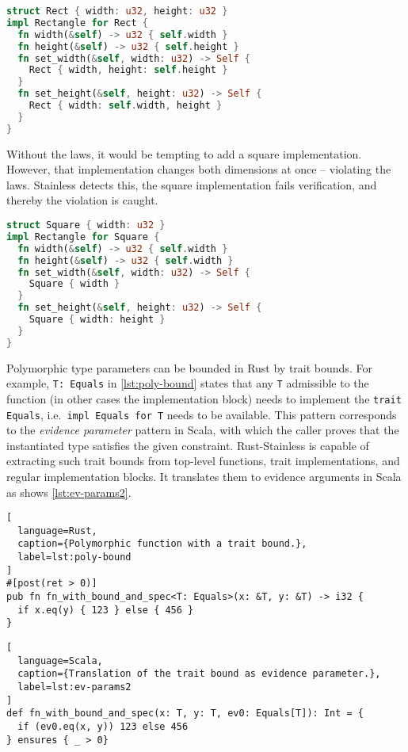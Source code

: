 \begin{lstlisting}[language=Rust, caption={Example implementation of the trait.}]
struct Rect { width: u32, height: u32 }
impl Rectangle for Rect {
  fn width(&self) -> u32 { self.width }
  fn height(&self) -> u32 { self.height }
  fn set_width(&self, width: u32) -> Self {
    Rect { width, height: self.height }
  }
  fn set_height(&self, height: u32) -> Self {
    Rect { width: self.width, height }
  }
}
\end{lstlisting}

Without the laws, it would be tempting to add a square implementation.
However, that implementation changes both dimensions at once --
violating the laws. Stainless detects this, the square implementation
fails verification, and thereby the violation is caught.

\begin{lstlisting}[language=Rust, caption={Example implementation violating the laws.}]
struct Square { width: u32 }
impl Rectangle for Square {
  fn width(&self) -> u32 { self.width }
  fn height(&self) -> u32 { self.width }
  fn set_width(&self, width: u32) -> Self {
    Square { width }
  }
  fn set_height(&self, height: u32) -> Self {
    Square { width: height }
  }
}
\end{lstlisting}

Polymorphic type parameters can be bounded in Rust by trait bounds. For example,
\lstinline!T: Equals! in \autoref{lst:poly-bound} states that any \lstinline!T!
admissible to the function (in other cases the implementation block) needs to
implement the \passthrough{\lstinline!trait Equals!},
i.e.~\lstinline!impl Equals for T! needs to be available. This pattern
corresponds to the \emph{evidence parameter} pattern in Scala, with which the
caller proves that the instantiated type satisfies the given constraint.
Rust-Stainless is capable of extracting such trait bounds from top-level
functions, trait implementations, and regular implementation blocks. It
translates them to evidence arguments in Scala as shows \autoref{lst:ev-params2}.

\begin{lstlisting}[
  language=Rust,
  caption={Polymorphic function with a trait bound.},
  label=lst:poly-bound
]
#[post(ret > 0)]
pub fn fn_with_bound_and_spec<T: Equals>(x: &T, y: &T) -> i32 {
  if x.eq(y) { 123 } else { 456 }
}
\end{lstlisting}

\begin{lstlisting}[
  language=Scala,
  caption={Translation of the trait bound as evidence parameter.},
  label=lst:ev-params2
]
def fn_with_bound_and_spec(x: T, y: T, ev0: Equals[T]): Int = {
  if (ev0.eq(x, y)) 123 else 456
} ensures { _ > 0}
\end{lstlisting}

